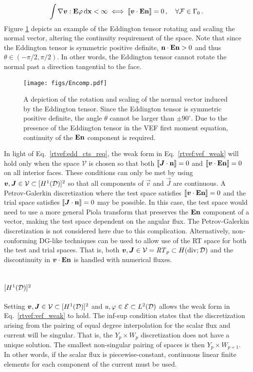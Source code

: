 \documentclass[../doc.tex]{subfiles}
\begin{document}
	\begin{equation} \label{rtvef:edd_cts_req}
		\int \nabla\boldsymbol{v} : \boldsymbol{\mathrm{E}}\varphi \mathop{}\!\mathrm{d} \boldsymbol{\mathrm{x}} < \infty \iff \left\llbracket\boldsymbol{v}\cdot\boldsymbol{\mathrm{E}}\boldsymbol{\mathrm{n}} \right\rrbracket = 0 \,, \quad \forall \mathcal{F} \in \Gamma_0 \,. 
	\end{equation}
Figure \ref{fig:Encomp} depicts an example of the Eddington tensor rotating and scaling the normal vector, altering the continuity requirement of the space. Note that since the Eddington tensor is symmetric positive definite, $\boldsymbol{\mathrm{n}}\cdot\boldsymbol{\mathrm{E}}\boldsymbol{\mathrm{n}} > 0$ and thus $\theta \in (-\pi/2,\pi/2)$. In other words, the Eddington tensor cannot rotate the normal past a direction tangential to the face. 
\begin{figure}
\centering
\texttt{[image: figs/Encomp.pdf]}
\caption{A depiction of the rotation and scaling of the normal vector induced by the Eddington tensor. Since the Eddington tensor is symmetric positive definite, the angle $\theta$ cannot be larger than $\pm 90^\circ$. Due to the presence of the Eddington tensor in the VEF first moment equation, continuity of the $\boldsymbol{\mathrm{E}}\boldsymbol{\mathrm{n}}$ component is required. }
\label{fig:Encomp}
\end{figure}

In light of Eq.~\ref{rtvef:edd_cts_req}, the weak form in Eq.~\ref{rtvef:vef_weak} will hold only when the space $\mathcal{V}$ is chosen so that both $\left\llbracket\boldsymbol{J}\cdot\boldsymbol{\mathrm{n}} \right\rrbracket = 0$ and $\left\llbracket\boldsymbol{v}\cdot\boldsymbol{\mathrm{E}}\boldsymbol{\mathrm{n}} \right\rrbracket = 0$ on all interior faces. These conditions can only be met by using $\boldsymbol{v}, \boldsymbol{J} \in \mathcal{V} \subset [H^1(\mathcal{D})]^2$ so that all components of $\vec{v}$ and $\vec{J}$ are continuous. A Petrov-Galerkin discretization where the test space satisfies $\left\llbracket\boldsymbol{v}\cdot\boldsymbol{\mathrm{E}}\boldsymbol{\mathrm{n}} \right\rrbracket = 0$ and the trial space satisfies $\left\llbracket\boldsymbol{J}\cdot\boldsymbol{\mathrm{n}} \right\rrbracket = 0$ may be possible. In this case, the test space would need to use a more general Piola transform that preserves the $\boldsymbol{\mathrm{E}}\boldsymbol{\mathrm{n}}$ component of a vector, making the test space dependent on the angular flux. The Petrov-Galerkin discretization is not considered here due to this complication. 
Alternatively, non-conforming DG-like techniques can be used to allow use of the RT space for both the test and trial spaces. That is, both $\boldsymbol{v}, \boldsymbol{J} \in \mathcal{V}=\mathit{RT}_p \subset H(\operatorname{div};\mathcal{D})$ and the discontinuity in $\boldsymbol{v}\cdot\boldsymbol{\mathrm{E}}\boldsymbol{\mathrm{n}}$ is handled with numerical fluxes. 

\subsection{$[H^1(\mathcal{D})]^2$}
Setting $\boldsymbol{v},\boldsymbol{J} \in \mathcal{V} \subset [H^1(\mathcal{D})]^2$ and $u,\varphi \in \mathcal{E} \subset L^2(\mathcal{D})$ allows the weak form in Eq.~\ref{rtvef:vef_weak} to hold. The inf-sup \cite{mfem_brezzi} condition states that the discretization arising from the pairing of equal degree interpolation for the scalar flux and current will be singular. That is, the $Y_p\times W_p$ discretization does not have a unique solution. The smallest non-singular pairing of spaces is then $Y_p \times W_{p+1}$. In other words, if the scalar flux is piecewise-constant, continuous linear finite elements for each component of the current must be used. 
\end{document}

